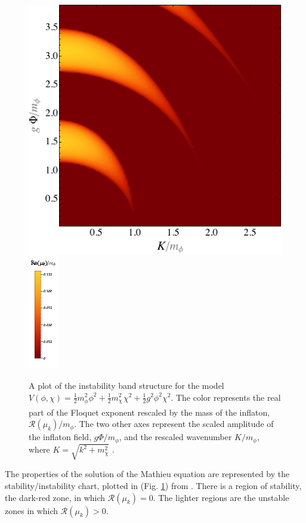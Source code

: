 \documentclass[11pt,a4paper,twoside]{book}
\begin{document}
\begin{figure}
	\centering
	\includegraphics[width=0.6\linewidth, height=0.4\textheight]{Images/Chap4/AminHertzberg_MathieuChart}
	\includegraphics[width=0.15\linewidth, height=0.4\textheight]{Images/Chap4/MathieuChart_Legend}	
	\caption{A plot of the instability band structure for the model $ V(\phi, \chi)=\frac{1}{2}m^{2}_{\phi}\phi^{2} + \frac{1}{2}m^{2}_{\chi_{_{_{}}}}\chi^{2} + \frac{1}{2}g^{2}\phi^{2}\chi^{2} $. The color represents the real part of the Floquet exponent rescaled by the mass of the inflaton, $ \mathcal{R}(\mu_{k})/m_{\phi} $. The two other axes represent the scaled amplitude of the inflaton field, $ g\Phi/m_{\phi} $, and the rescaled wavenumber $ K/m_{\phi} $, where $ K=\sqrt{k^{2} + m^{2}_{\chi}} $ \cite{Chap4:AminHetrzberg}.}
	\label{fig:mathieuchartlegend}
\end{figure}
The properties of the solution of the Mathieu equation are represented by the stability/instability chart, plotted in (Fig. \ref{fig:mathieuchartlegend}) from \cite{Chap4:AminHetrzberg}. There is a region of stability, the dark-red zone, in which $\mathcal{R}(\mu_{k})=0$. The lighter regions are the  unstable zones in which $\mathcal{R}(\mu_{k})>0$. \\
\end{document}
